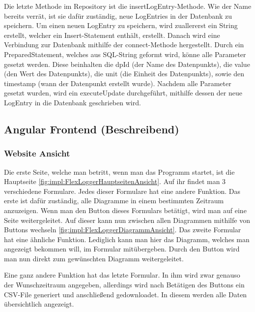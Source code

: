 Die letzte Methode im Repository ist die insertLogEntry-Methode. Wie der Name bereits verrät, ist sie dafür zuständig, neue LogEntries in der Datenbank zu speichern. Um einen neuen LogEntry zu speichern, wird zuallererst ein String erstellt, welcher ein Insert-Statement enthält, erstellt. 
Danach wird eine Verbindung zur Datenbank mithilfe der connect-Methode hergestellt. Durch ein PreparedStatement, welches aus SQL-String geformt wird, könne alle Parameter gesetzt werden. Diese beinhalten die dpId (der Name des Datenpunkts), die value (den Wert des Datenpunkts), die unit (die Einheit des Datenpunkts), sowie den timestamp (wann der Datenpunkt erstellt wurde). Nachdem alle Parameter gesetzt wurden, wird ein executeUpdate durchgeführt, mithilfe dessen der neue LogEntry in die Datenbank geschrieben wird. 

\subsection{Angular Frontend (Beschreibend)}
\subsubsection{Website Ansicht}
Die erste Seite, welche man betritt, wenn man das Programm startet, ist die Hauptseite \ref{fig:impl:FlexLoggerHauptseitenAnsicht}. Auf ihr findet man 3 verschiedene Formulare. Jedes dieser Formulare hat eine andere Funktion. Das erste ist dafür zuständig, alle Diagramme in einem bestimmten Zeitraum anzuzeigen. Wenn man den Button dieses Formulars betätigt, wird man auf eine Seite weitergeleitet. Auf dieser kann nun zwischen allen Diagrammen mithilfe von Buttons wechseln \ref{fig:impl:FlexLoggerDiagrammAnsicht}. Das zweite Formular hat eine ähnliche Funktion. Lediglich kann man hier das Diagramm, welches man angezeigt bekommen will, im Formular mitübergeben. Durch den Button wird man nun direkt zum gewünschten Diagramm weitergeleitet. 

Eine ganz andere Funktion hat das letzte Formular. In ihm wird zwar genauso der Wunschzeitraum angegeben, allerdings wird nach Betätigen des Buttons ein CSV-File generiert und anschließend gedownloadet. In diesem werden alle Daten übersichtlich angezeigt. 



